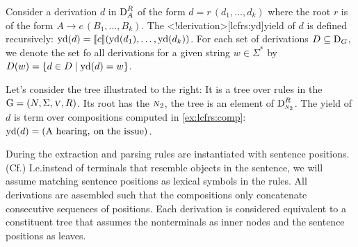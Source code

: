 \documentclass[../../document.tex]{subfiles}
\begin{document}
    \begin{definition}[Yield]
        Consider a derivation \(d\) in \(\operatorname{D}^R_A\) of the form \(d = r\,(d_1, \ldots, d_k)\) where the root \(r\) is of the form \(A \to c\,(B_1, \ldots, B_k)\).
        The <\lcfrs!derivation>[lcfrs:yd]{yield} of \(d\) is defined recursively: \(\operatorname{yd}(d) = \llbracket c\rrbracket(\operatorname{yd}(d_1), \ldots, \operatorname{yd}(d_k))\).
        For each set of derivations \(D \subseteq \operatorname{D}_G\), we denote the set fo all derivations for a given string \(w \in \varSigma^*\) by \(D(w) = \{d\in D \mid \operatorname{yd}(d) = w\}\).
    \end{definition}

    \vspace{.2cm}

    \noindent
    \begin{minipage}[b]{.5\linewidth}
        \begin{example}\label{ex:lcfrs:deriv}
            Let's consider the tree illustrated to the right:
                It is a tree over rules in the  \(\mathrm{G} = (N, \Sigma, \textsc{\textsl{v}}, R)\).
            Its root has the  \(\textsc{\textsl{n}}_2\), the tree is an element of \(\operatorname{D}^R_{\textsc{\textsl{n}}_2}\).
            The yield of \(d\) is term over compositions computed in \cref{ex:lcfrs:comp}: \(\operatorname{yd}(d) = (\text{A hearing}, \: \text{on the issue})\).
        \end{example}
    \end{minipage}
    \hfill

    \vspace{\baselineskip}

    During the extraction and parsing rules are instantiated with sentence positions. (Cf.\@ \cite[Def. 6.8]{Kal10})
    I.e.\@ instead of terminals that resemble objects in the sentence, we will assume matching sentence positions as lexical symbols in the rules.
    All derivations are assembled such that the compositions only concatenate consecutive sequences of positions.
    Each derivation is considered equivalent to a constituent tree that assumes the  nonterminals as inner nodes and the sentence positions as leaves.
\end{document}
